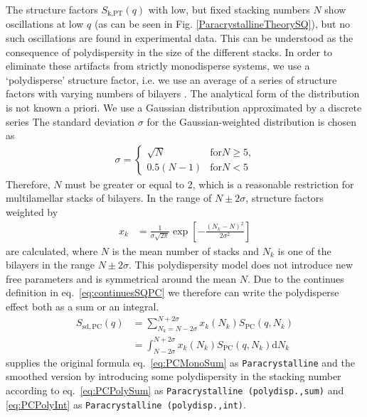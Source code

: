 The structure factors $S_\text{k,PT}(q)$ with low, but fixed
stacking numbers $N$ show oscillations at low $q$ (as can be seen in
Fig. \ref{ParacrystallineTheorySQ}), but no such oscillations are
found in experimental data. This can be understood as the
consequence of polydispersity in the size of the different stacks.
In order to eliminate these artifacts from strictly monodisperse
systems, we use a `polydisperse' structure factor, i.e. we use an
average of a series of structure factors with varying numbers of
bilayers \cite{Fruhwirth2004}. The analytical form of the
distribution is not known a priori. We use a Gaussian distribution
approximated by a discrete series The standard deviation $\sigma$
for the Gaussian-weighted distribution is chosen as
\begin{align}
\sigma =
\begin{cases}
\sqrt{N} & \text{for} N\geq 5 \text{,} \\
0.5(N-1) & \text{for} N< 5
\end{cases}
\end{align}
Therefore, $N$ must be greater or equal to 2, which is a
reasonable restriction for multilamellar stacks of bilayers. In
the range of $N \pm 2\sigma$, structure factors weighted by
\begin{align}
x_k & = \frac{1}{\sigma\sqrt{2\pi}} \exp\left[
-\frac{(N_k-N)^2}{2\sigma^2}\right]
\end{align}
are calculated, where $N$ is the mean number of stacks and $N_k$
is one of the  bilayers in the range $N\pm 2\sigma$. This
polydispersity model does not introduce new free parameters and is
symmetrical around the mean $N$.
 Due to the continues definition in eq.\ \ref{eq:continuesSQPC} we therefore can write the polydisperse effect both as a sum or an integral.
\begin{align}
  S_\mathrm{sd,PC}(q) & = \sum_{N_k=N-2\sigma}^{N+2\sigma} x_k(N_k) S_\mathrm{PC}(q,N_k) \label{eq:PCPolySum} \\
                      & = \int_{N-2\sigma}^{N+2\sigma} x_k(N_k) S_\mathrm{PC}(q,N_k) \mathrm{d}N_k \label{eq:PCPolyInt}
\end{align}
\SASfit supplies the original formula eq.\ \ref{eq:PCMonoSum} as  \texttt{Paracrystalline} and the smoothed version by introducing some polydispersity in the stacking number according to eq.\ \ref{eq:PCPolySum} as \texttt{Paracrystalline (polydisp.,sum)} and \ref{eq:PCPolyInt} as \texttt{Paracrystalline (polydisp.,int)}.


